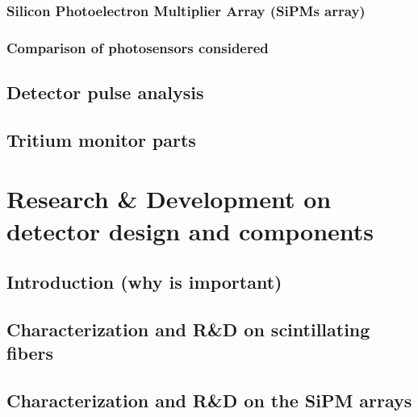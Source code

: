 \documentclass[12pt,a4paper]{book}
\begin{document}
			\subsection{Silicon Photoelectron Multiplier Array (SiPMs array)}%
			\label{subsec:SiPM}
			
			\subsection[Comparison photosensors]{Comparison of photosensors considered}%
			\label{subsec:ComparisonPhotosensors}
			\newpage
		
	\section{Detector pulse analysis}%
	\label{sec:PulseAnalysis}
	\newpage
	
	\section{Tritium monitor parts}%
	\label{sec:TritiumMonitorParts}	
	\newpage
	
\chapter[Research \& Development]{Research \& Development on detector design and components}\label{chap:ResearchandDevelopment}
	\section{Introduction (why is important)}
	\newpage
	
	\section[Characetrization fibers]{Characterization and R\&D on scintillating fibers}
	\newpage
		
	\section[Characterization SiPM arrays]{Characterization and R\&D on the SiPM arrays}
	\newpage
\end{document}
